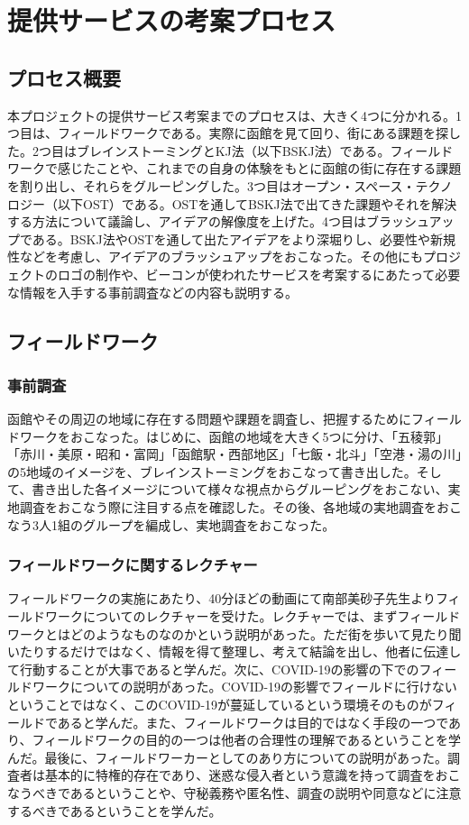 \chapter{提供サービスの考案プロセス}

\section{プロセス概要}
本プロジェクトの提供サービス考案までのプロセスは、大きく4つに分かれる。1つ目は、フィールドワークである。実際に函館を見て回り、街にある課題を探した。2つ目はブレインストーミングとKJ法（以下BSKJ法）である。フィールドワークで感じたことや、これまでの自身の体験をもとに函館の街に存在する課題を割り出し、それらをグルーピングした。3つ目はオープン・スペース・テクノロジー（以下OST）である。OSTを通してBSKJ法で出てきた課題やそれを解決する方法について議論し、アイデアの解像度を上げた。4つ目はブラッシュアップである。BSKJ法やOSTを通して出たアイデアをより深堀りし、必要性や新規性などを考慮し、アイデアのブラッシュアップをおこなった。その他にもプロジェクトのロゴの制作や、ビーコンが使われたサービスを考案するにあたって必要な情報を入手する事前調査などの内容も説明する。

\section{フィールドワーク}

\subsection{事前調査}
函館やその周辺の地域に存在する問題や課題を調査し、把握するためにフィールドワークをおこなった。はじめに、函館の地域を大きく5つに分け、「五稜郭」「赤川・美原・昭和・富岡」「函館駅・西部地区」「七飯・北斗」「空港・湯の川」の5地域のイメージを、ブレインストーミングをおこなって書き出した。そして、書き出した各イメージについて様々な視点からグルーピングをおこない、実地調査をおこなう際に注目する点を確認した。その後、各地域の実地調査をおこなう3人1組のグループを編成し、実地調査をおこなった。


\subsection{フィールドワークに関するレクチャー}
フィールドワークの実施にあたり、40分ほどの動画にて南部美砂子先生よりフィールドワークについてのレクチャーを受けた。レクチャーでは、まずフィールドワークとはどのようなものなのかという説明があった。ただ街を歩いて見たり聞いたりするだけではなく、情報を得て整理し、考えて結論を出し、他者に伝達して行動することが大事であると学んだ。次に、COVID-19の影響の下でのフィールドワークについての説明があった。COVID-19の影響でフィールドに行けないということではなく、このCOVID-19が蔓延しているという環境そのものがフィールドであると学んだ。また、フィールドワークは目的ではなく手段の一つであり、フィールドワークの目的の一つは他者の合理性の理解であるということを学んだ。最後に、フィールドワーカーとしてのあり方についての説明があった。調査者は基本的に特権的存在であり、迷惑な侵入者という意識を持って調査をおこなうべきであるということや、守秘義務や匿名性、調査の説明や同意などに注意するべきであるということを学んだ。

